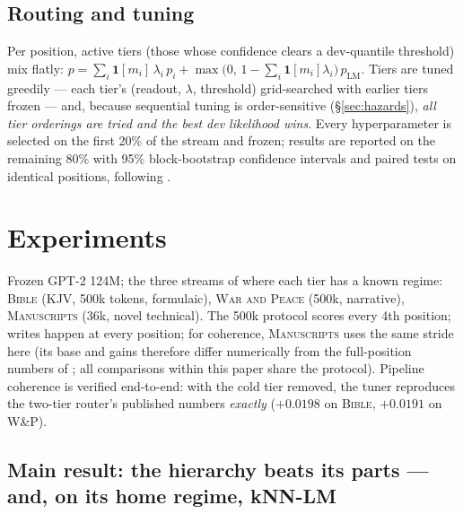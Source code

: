 \documentclass[11pt]{article}
\begin{document}
\subsection{Routing and tuning}

Per position, active tiers (those whose confidence clears a dev-quantile threshold) mix flatly:
$p = \sum_i \mathbf{1}[m_i]\, \lambda_i\, p_i + \max\!\big(0,\, 1 - \sum_i \mathbf{1}[m_i]\lambda_i\big)\, p_{\mathrm{LM}}$.
Tiers are tuned greedily --- each tier's (readout, $\lambda$, threshold) grid-searched with earlier tiers frozen --- and, because sequential tuning is order-sensitive (\S\ref{sec:hazards}), \emph{all tier orderings are tried and the best dev likelihood wins}. Every hyperparameter is selected on the first 20\% of the stream and frozen; results are reported on the remaining 80\% with 95\% block-bootstrap confidence intervals and paired tests on identical positions, following \cite{sillage}.

\section{Experiments}

Frozen GPT-2 124M; the three streams of \cite{sillage,router} where each tier has a known regime: \textsc{Bible} (KJV, 500k tokens, formulaic), \textsc{War and Peace} (500k, narrative), \textsc{Manuscripts} (36k, novel technical). The 500k protocol scores every 4th position; writes happen at every position; for coherence, \textsc{Manuscripts} uses the same stride here (its base and gains therefore differ numerically from the full-position numbers of \cite{sillage,router}; all comparisons within this paper share the protocol). Pipeline coherence is verified end-to-end: with the cold tier removed, the tuner reproduces the two-tier router's published numbers \emph{exactly} ($+0.0198$ on \textsc{Bible}, $+0.0191$ on \textsc{W\&P}).

\subsection{Main result: the hierarchy beats its parts --- and, on its home regime, kNN-LM}\label{sec:main}
\end{document}
